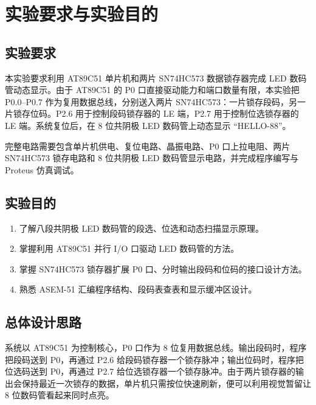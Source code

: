 \section{实验要求与实验目的}

\subsection{实验要求}
本实验要求利用 AT89C51 单片机和两片 SN74HC573 数据锁存器完成 LED 数码管动态显示。由于 AT89C51 的 P0 口直接驱动能力和端口数量有限，本实验把 P0.0--P0.7 作为复用数据总线，分别送入两片 SN74HC573：一片锁存段码，另一片锁存位码。P2.6 用于控制段码锁存器的 LE 端，P2.7 用于控制位选锁存器的 LE 端。系统复位后，在 8 位共阴极 LED 数码管上动态显示 ``HELLO-88''。

完整电路需要包含单片机供电、复位电路、晶振电路、P0 口上拉电阻、两片 SN74HC573 锁存电路和 8 位共阴极 LED 数码管显示电路，并完成程序编写与 Proteus 仿真调试。

\subsection{实验目的}
\begin{enumerate}
  \item 了解八段共阴极 LED 数码管的段选、位选和动态扫描显示原理。
  \item 掌握利用 AT89C51 并行 I/O 口驱动 LED 数码管的方法。
  \item 掌握 SN74HC573 锁存器扩展 P0 口、分时输出段码和位码的接口设计方法。
  \item 熟悉 ASEM-51 汇编程序结构、段码表查表和显示缓冲区设计。
\end{enumerate}

\subsection{总体设计思路}
系统以 AT89C51 为控制核心，P0 口作为 8 位复用数据总线。输出段码时，程序把段码送到 P0，再通过 P2.6 给段码锁存器一个锁存脉冲；输出位码时，程序把位选码送到 P0，再通过 P2.7 给位选锁存器一个锁存脉冲。由于两片锁存器的输出会保持最近一次锁存的数据，单片机只需按位快速刷新，便可以利用视觉暂留让 8 位数码管看起来同时点亮。

